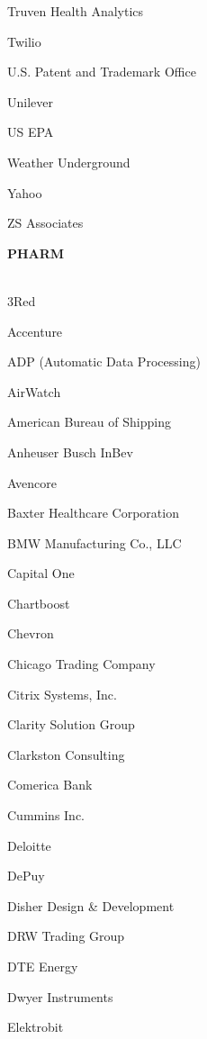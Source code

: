 \documentclass[twoside]{article}
\begin{document}
\begin{center}
\begin{multicols}{5}
\begin{FlushLeft}
\begin{compactitem}
\item Truven Health Analytics
\item Twilio
\item U.S. Patent and Trademark Office
\item Unilever
\item US EPA
\item Weather Underground
\item Yahoo
\item ZS Associates
\end{compactitem}
        \end{FlushLeft}
        \vspace{1em}
        {\fontsize{14}{16}\selectfont \bf PHARM}\\
        \vspace{-1em}
        ~\hrulefill~
        \vspace{-.9em}
        \begin{FlushLeft}
        \begin{compactitem}
        \item 3Red
\item Accenture
\item ADP (Automatic Data Processing)
\item AirWatch
\item American Bureau of Shipping
\item Anheuser Busch InBev
\item Avencore
\item Baxter Healthcare Corporation
\item BMW Manufacturing Co., LLC
\item Capital One
\item Chartboost
\item Chevron
\item Chicago Trading Company
\item Citrix Systems, Inc.
\item Clarity Solution Group
\item Clarkston Consulting
\item Comerica Bank
\item Cummins Inc.
\item Deloitte
\item DePuy
\item Disher Design \& Development
\item DRW Trading Group
\item DTE Energy
\item Dwyer Instruments
\item Elektrobit

\end{compactitem}
\end{FlushLeft}
\end{multicols}
\end{center}
\end{document}
